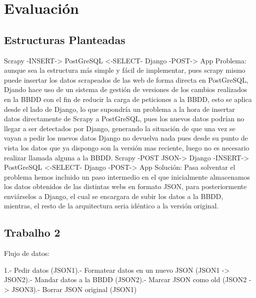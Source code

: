 \chapter[Evaluación]{Evaluación}
\label{Chap4}

\section{Estructuras Planteadas}

Scrapy -INSERT-> PostGreSQL <-SELECT- Django -POST-> App\newline
Problema: aunque sea la estructura más simple y fácil de implementar, pues scrapy mismo puede insertar los datos scrapeados de las web de forma directa en PostGreSQL, Djando hace uso de un sistema de gestión de versiones de los cambios realizados en la BBDD con el fin de reducir la carga de peticiones a la BBDD, esto se aplica desde el lado de Django, lo que supondría un problema a la hora de insertar datos directamente de Scrapy a PostGreSQL, pues los nuevos datos podrían no llegar a ser detectados por Django, generando la situación de que una vez se vayan a pedir los nuevos datos Django no devuelva nada pues desde su punto de vista los datos que ya dispongo son la versión mas reciente, luego no es necesario realizar llamada alguna a la BBDD.
\newline
\newline
Scrapy -POST JSON-> Django -INSERT-> PostGreSQL <-SELECT- Django -POST-> App\newline
Solución: Pasa solventar el problema hemos incluido un paso intermedio en el que inicialmente almacenamos los datos obtenidos de las distintas webs en formato JSON, para posteriormente enviárselos a Django, el cual se encargara de subir los datos a la BBDD, mientras, el resto de la arquitectura seria idéntico a la versión original.

\section{Trabalho 2}
Flujo de datos:\newline

1.- Pedir datos (JSON1).- Formatear datos en un nuevo JSON (JSON1 -> JSON2).- Mandar datos a la BBDD (JSON2).- Marcar JSON como old (JSON2 -> JSON3).- Borrar JSON original (JSON1)\newline

